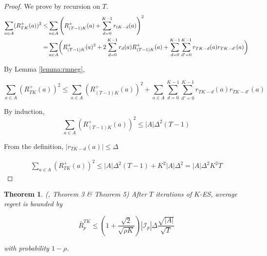 \documentclass{article}
\newtheorem{theorem}{Theorem}
\newtheorem{corollary}{Corollary}
\begin{document}
\begin{proof}

We prove by recursion on $T$.
\begin{align}
    \sum_{a\in A}(R_{TK}^+(a))^2 \leq & 
    \sum_{a\in A}\left(R_{(T-1)K}^+(a) + \sum_{d=0}^{K-1}{r_{tK-d}(a)} \right)^2 \\
    = & \sum_{a\in A} \biggl( R_{(T-1)K}^+(a)^2 +
        2 \sum_{d=0}^{K-1}r_d(a) R_{(T-1)K}^+(a) + \sum_{d=0}^{K-1}\sum_{d'=0}^{K-1}r_{TK-d}(a) r_{TK-d'}(a) \biggr)
\end{align}

By Lemma \ref{lemma:rmneg}, 

\begin{equation}
    \sum_{a\in A}(R_{TK}^+(a))^2 \leq 
            \sum_{a\in A} (R_{(T-1)K}^+(a))^2 +
            \sum_{a\in A} \sum_{d=0}^{K-1}\sum_{d'=0}^{K-1}r_{TK-d}(a) r_{TK-d'}(a)
\end{equation}

By induction,
\begin{equation}
    \sum_{a\in A}(R_{(T-1)K}^+(a))^2 \leq |A|\Delta^2 (T-1)
\end{equation}

From the definition, $|r_{TK-d}(a)|\leq \Delta$

\begin{align}
    \sum_{a\in A}(R_{TK}^+(a))^2 \leq 
           |A|\Delta^2 (T-1) + K^2 |A| \Delta^2
            = |A| \Delta^2 K^2 T 
\end{align}

\end{proof}



\begin{theorem} (\citealt{lanctot2013monte}, Theorem 3 \& Theorem 5)
\label{thm:mccfr_bound}
After $T$ iterations of $K$-ES, average regret is bounded by

\begin{equation}
    \bar{R}_p^{TK} \leq
    \left( 1 + \frac{\sqrt{2}}{\sqrt{\rho K}} \right)
    |\mathcal{I}_p|\Delta \frac{\sqrt{|A|}}{\sqrt{T}}
\label{thm:lanctot_external2}
\end{equation}

with probability $1-\rho$.

\end{theorem}
\end{document}
